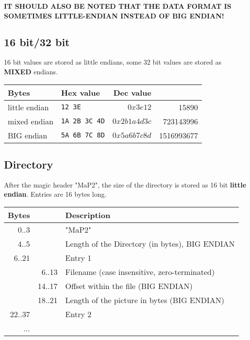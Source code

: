 \documentclass[11pt,twoside,openright]{report}
\begin{document}
\endpicture

{\bf IT SHOULD ALSO BE NOTED THAT THE DATA FORMAT IS SOMETIMES LITTLE-ENDIAN INSTEAD OF BIG ENDIAN!}
\subsection{16 bit/32 bit}
16 bit values are stored as little endians, some 32 bit values are stored as {\bf MIXED} endians.\\
\begin{center}
\begin{tabular}{l|l|r|r}
Bytes&Hex value&Dec value\\\hline
little endian&{\tt 12 3E}&$0x3e12$&15890\\
mixed endian&{\tt 1A 2B 3C 4D}&$0x2b1a4d3c$&723143996\\
BIG endian&{\tt 5A 6B 7C 8D}&$0x5a6b7c8d$&1516993677\\
\end{tabular}
\end{center}

\subsection{Directory}
After the magic header "MaP2", the size of the directory is stored as 16 bit {\bf little endian}. Entries are 16 bytes long.\\
\begin{tabular}{rr|l}
Bytes&&Description\\\hline
0..3&&"MaP2"\\\hline
4..5&&Length of the Directory (in bytes), BIG ENDIAN\\\hline
6..21&&Entry 1\\
&6..13&Filename (case insensitive, zero-terminated)\\
&14..17&Offset within the file (BIG ENDIAN)\\
&18..21&Length of the picture in bytes (BIG ENDIAN)\\\hline
22..37&&Entry 2\\
...
\end{tabular}
\end{document}
